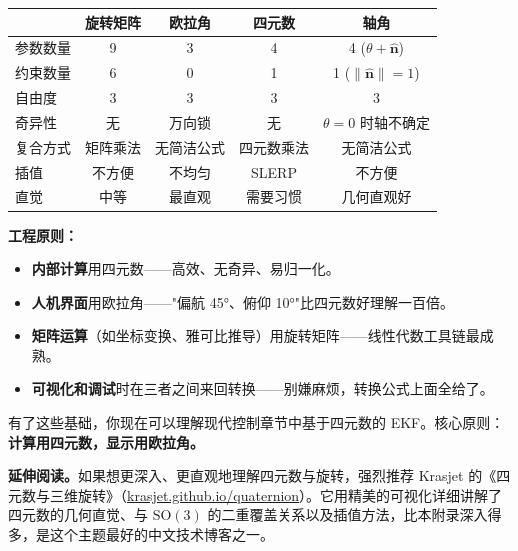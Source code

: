 \begin{center}
\begin{tabular}{lcccc}
\hline
& \textbf{旋转矩阵} & \textbf{欧拉角} & \textbf{四元数} & \textbf{轴角} \\
\hline
参数数量 & 9 & 3 & 4 & 4 ($\theta + \hat{\mathbf{n}}$) \\
约束数量 & 6 & 0 & 1 & 1 ($\|\hat{\mathbf{n}}\| = 1$) \\
自由度 & 3 & 3 & 3 & 3 \\
奇异性 & 无 & 万向锁 & 无 & $\theta = 0$ 时轴不确定 \\
复合方式 & 矩阵乘法 & 无简洁公式 & 四元数乘法 & 无简洁公式 \\
插值 & 不方便 & 不均匀 & SLERP & 不方便 \\
直觉 & 中等 & 最直观 & 需要习惯 & 几何直观好 \\
\hline
\end{tabular}
\end{center}

\textbf{工程原则：}
\begin{itemize}
    \item \textbf{内部计算}用四元数——高效、无奇异、易归一化。
    \item \textbf{人机界面}用欧拉角——"偏航 45°、俯仰 10°"比四元数好理解一百倍。
    \item \textbf{矩阵运算}（如坐标变换、雅可比推导）用旋转矩阵——线性代数工具链最成熟。
    \item \textbf{可视化和调试}时在三者之间来回转换——别嫌麻烦，转换公式上面全给了。
\end{itemize}

有了这些基础，你现在可以理解现代控制章节中基于四元数的 EKF。核心原则：\textbf{计算用四元数，显示用欧拉角。}

\textbf{延伸阅读。}如果想更深入、更直观地理解四元数与旋转，强烈推荐 Krasjet 的《四元数与三维旋转》（\href{https://krasjet.github.io/quaternion/quaternion.pdf}{krasjet.github.io/quaternion}）。它用精美的可视化详细讲解了四元数的几何直觉、与 $\mathrm{SO}(3)$ 的二重覆盖关系以及插值方法，比本附录深入得多，是这个主题最好的中文技术博客之一。
